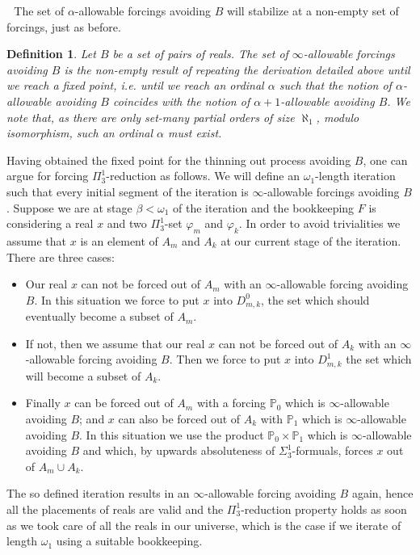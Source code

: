 \documentclass[a4paper,11pt]{article}
\newtheorem{definition}[theorem]{Definition}
\newcommand{\forceP}{\mathbb{P}}
\begin{document}
    ﻿
    ﻿
    The set of $\alpha$-allowable forcings avoiding $B$ will stabilize at a non-empty set of forcings, just as before. 
    \begin{definition}\label{inftallowableAvoidingB}
    Let $B$ be a set of pairs of reals. The set of $\infty$-allowable forcings avoiding $B$ is the non-empty result of repeating the derivation detailed above until we reach a fixed point, i.e. until we reach an ordinal $\alpha$ such that the notion of $\alpha$-allowable avoiding $B$ coincides with the notion of $\alpha+1$-allowable avoiding $B$. We note that, as there are only set-many partial orders of size $\aleph_1$, modulo isomorphism, such an ordinal $\alpha$ must exist.
    \end{definition}

Having obtained the fixed point for the thinning out process avoiding $B$, one can argue for forcing $\Pi^1_3$-reduction as follows.
We will define an $\omega_1$-length iteration such that every initial segment of the iteration is $\infty$-allowable forcings avoiding $B$. Suppose we are at stage $\beta < \omega_1$ of the iteration and the bookkeeping $F$ is considering a real $x$ and two $\Pi^1_3$-set $\varphi_m$ and $\varphi_k$. In order to avoid trivialities we assume that $x$ is an element of $A_m$ and $A_k$ at our current stage of the iteration. There are three cases:
\begin{itemize}
\item Our real $x$ can not be forced out of $A_m$ with an $\infty$-allowable forcing avoiding $B$. In this situation we force to put $x$ into $D^0_{m,k}$, the set which should eventually become a subset of $A_m$.
\item If not, then we assume that our real $x$ can not be forced out of $A_k$ with an $\infty$-allowable forcing avoiding $B$. Then we force to put $x$ into $D^1_{m,k}$ the set which will become a subset of $A_k$.
\item Finally $x$ can be forced out of $A_m$ with a forcing $\forceP_0$ which is $\infty$-allowable avoiding $B$; and $x$ can also be forced out of $A_k$ with $\forceP_1$ which is $\infty$-allowable avoiding $B$. In this situation we use the product $\forceP_0 \times \forceP_1$ which is $\infty$-allowable avoiding $B$ and which, by upwards absoluteness of $\Sigma^1_3$-formuals, forces $x$ out of $A_m \cup A_k$.
\end{itemize}
The so defined iteration results in an $\infty$-allowable forcing avoiding $B$ again, hence all the placements of reals are valid and the $\Pi^1_3$-reduction property holds as soon as we took care of all the reals in our universe, which is the case if we iterate of length $\omega_1$ using a suitable bookkeeping.
\end{document}
